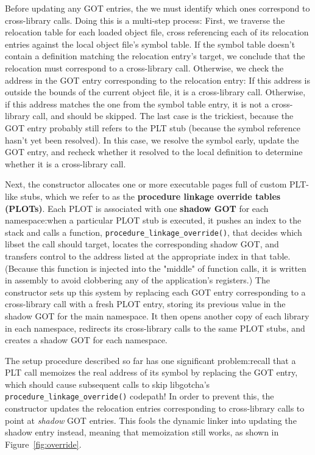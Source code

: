 Before updating any GOT entries, the we must identify
which ones correspond to cross-library calls.  Doing this is a multi-step process:
First, we traverse the relocation table for each loaded object file, cross
referencing each of its relocation entries against the local object file's symbol
table.  If the symbol table doesn't contain a definition matching the relocation
entry's target, we conclude that the relocation must correspond to a cross-library
call.  Otherwise, we check the address in the GOT entry corresponding to the
relocation entry:  If this address is outside the bounds of the current object file,
it is a cross-library call.  Otherwise, if this address matches the one from the
symbol table entry, it is not a cross-library call, and should be skipped.  The last
case is the trickiest, because the GOT entry probably still refers to the PLT stub
(because the symbol reference hasn't yet been resolved).  In this case, we resolve
the symbol
early, update the GOT entry, and recheck whether it resolved to the local definition
to determine whether it is a cross-library call.

Next, the constructor allocates one or more executable pages full of custom PLT-like
stubs, which we refer to as the \textbf{procedure linkage override tables (PLOTs)}.
Each PLOT is associated with one \textbf{shadow GOT} for each namespace:\@ when a
particular PLOT stub is executed, it pushes an index to the stack and calls a
function, \texttt{procedure\_linkage\_override()}, that decides which libset the call
should target, locates the corresponding shadow GOT, and transfers control to the
address listed at the appropriate index in that table.  (Because this function
is injected into the "middle" of function calls, it is written in assembly to avoid
clobbering any of the application's registers.)  The constructor sets up this system
by replacing each GOT entry corresponding to a cross-library call with a fresh PLOT
entry, storing its previous value in the shadow GOT for the main namespace.  It
then opens another copy of each library in each namespace, redirects its
cross-library calls to the same PLOT stubs, and creates a shadow GOT for each
namespace.

The setup procedure described so far has one significant problem:\@ recall that a PLT
call memoizes the real address of its symbol by replacing the GOT entry, which should
cause subsequent calls to skip libgotcha's \texttt{procedure\_linkage\_override()}
codepath!  In order to prevent this, the constructor updates the relocation entries
corresponding to cross-library calls to point at \textit{shadow} GOT entries.  This
fools the dynamic linker into updating the shadow entry instead, meaning that
memoization still works, as shown in Figure~\ref{fig:override}.

